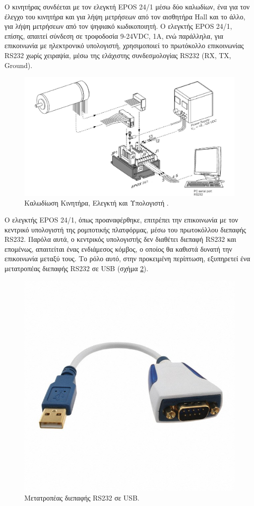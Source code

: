 Ο κινητήρας συνδέεται με τον ελεγκτή {EPOS 24/1} μέσω δύο καλωδίων, ένα για τον έλεγχο του κινητήρα και για λήψη μετρήσεων από τον {αισθητήρα Hall} και το άλλο, για λήψη μετρήσεων από τον {ψηφιακό κωδικοποιητή}. Ο ελεγκτής {EPOS 24/1}, επίσης, απαιτεί σύνδεση σε τροφοδοσία 9-24VDC, 1Α, ενώ παράλληλα, για επικοινωνία με ηλεκτρονικό υπολογιστή, χρησιμοποιεί το πρωτόκολλο επικοινωνίας {RS232} χωρίς χειραψία, μέσω της ελάχιστης συνδεσμολογίας {RS232} (RX, TX, Ground).

\begin{figure}[!ht]
		\centering
		\includegraphics[width=0.6\linewidth]{Chapters/Chapter2/Figures/motor_minimum_wiring.jpg}
		\caption[Καλωδίωση Κινητήρα, Ελεγκτή και Υπολογιστή.]{Καλωδίωση Κινητήρα, Ελεγκτή και Υπολογιστή \cite{epos241_manual}.}
		\label{fig:motor_minimum_wiring}
\end{figure}

O ελεγκτής {EPOS 24/1}, όπως προαναφέρθηκε, επιτρέπει την επικοινωνία με τον κεντρικό υπολογιστή της ρομποτικής πλατφόρμας, μέσω του πρωτοκόλλου διεπαφής {RS232}. Παρόλα αυτά, ο κεντρικός υπολογιστής δεν διαθέτει διεπαφή {RS232} και επομένως, απαιτείται ένας ενδιάμεσος κόμβος, ο οποίος θα καθιστά δυνατή την επικοινωνία μεταξύ τους. Το ρόλο αυτό, στην προκειμένη περίπτωση, εξυπηρετεί ένα {μετατροπέας διεπαφής RS232 σε USB} (σχήμα \ref{fig:rs232_to_usb_adapter}).

\begin{figure}[!ht]
		\centering
		\includegraphics[width=.3\linewidth]{Chapters/Chapter2/Figures/rs232_to_usb_adapter.jpg}
		\caption{Μετατροπέας διεπαφής RS232 σε USB.}
		\label{fig:rs232_to_usb_adapter}
\end{figure}

